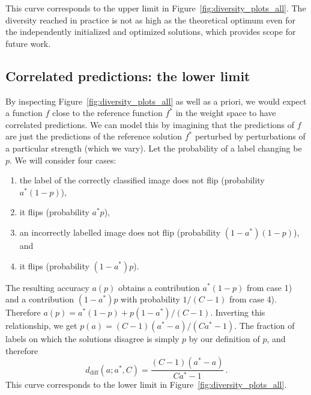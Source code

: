 \documentclass{article}
\begin{document}
This curve corresponds to the upper limit in Figure~\ref{fig:diversity_plots_all}. The diversity reached in practice is not as high as the theoretical optimum even for the independently initialized and optimized solutions, which provides scope for future work.  

\subsection{Correlated predictions: the lower limit}
By inspecting Figure~\ref{fig:diversity_plots_all} as well as a priori, we would expect a function $f$ close to the reference function $f^*$ in the weight space to have correlated predictions. We can model this by imagining that the predictions of $f$ are just the predictions of the reference solution $f^*$ perturbed by perturbations of a particular strength (which we vary). 
Let the probability of a label changing be $p$. 
%
We will consider four cases: %
\begin{enumerate}[itemsep=0em,leftmargin=25pt]
    \item the label of the correctly classified image does not flip (probability $a^* (1-p)$), 
    \item it flips (probability $a^* p$), 
    \item an incorrectly labelled image does not flip (probability $(1-a^*) (1-p)$), and 
    \item it flips (probability $(1-a^*) p$).
\end{enumerate}
The resulting accuracy $a(p)$ obtains a contribution $a^* (1-p)$ from case 1) and a contribution $(1-a^*) p$ with probability $1/(C-1)$ from case 4). Therefore $a(p) = a^* (1-p) + p (1-a^*)/(C-1)$. Inverting this relationship, we get $p(a) = (C-1)(a^* - a)/(Ca^* - 1)$. The fraction of labels on which the solutions disagree is simply $p$ by our definition of $p$, and therefore
\begin{equation}
d_{\mathrm{diff}}(a; a^*, C) = \frac{(C-1)(a^*-a)}{Ca^* - 1} \, .
\end{equation}
This curve corresponds to the lower limit in Figure~\ref{fig:diversity_plots_all}.
\end{document}
